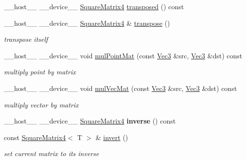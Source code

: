 \begin{DoxyCompactItemize}
\item 
\+\_\+\+\_\+host\+\_\+\+\_\+ \+\_\+\+\_\+device\+\_\+\+\_\+ \hyperlink{class_square_matrix4}{Square\+Matrix4} \hyperlink{class_square_matrix4_a23f36c4b337c5b238b4d3fae04e6f2f0}{transposed} () const
\item 
\+\_\+\+\_\+host\+\_\+\+\_\+ \+\_\+\+\_\+device\+\_\+\+\_\+ \hyperlink{class_square_matrix4}{Square\+Matrix4} \& \hyperlink{class_square_matrix4_a7d6f675b8ae538a7c53fe1e8c390e8b3}{transpose} ()\hypertarget{class_square_matrix4_a7d6f675b8ae538a7c53fe1e8c390e8b3}{}\label{class_square_matrix4_a7d6f675b8ae538a7c53fe1e8c390e8b3}

\begin{DoxyCompactList}\small\item\em transpose itself \end{DoxyCompactList}\item 
\+\_\+\+\_\+host\+\_\+\+\_\+ \+\_\+\+\_\+device\+\_\+\+\_\+ void \hyperlink{class_square_matrix4_a96f083743422ca964d865b1034e608b4}{mul\+Point\+Mat} (const \hyperlink{class_vec3}{Vec3} \&src, \hyperlink{class_vec3}{Vec3} \&dst) const
\begin{DoxyCompactList}\small\item\em multiply point by matrix \end{DoxyCompactList}\item 
\+\_\+\+\_\+host\+\_\+\+\_\+ \+\_\+\+\_\+device\+\_\+\+\_\+ void \hyperlink{class_square_matrix4_a559765a38296c2949976c00347098fb0}{mul\+Vec\+Mat} (const \hyperlink{class_vec3}{Vec3} \&src, \hyperlink{class_vec3}{Vec3} \&dst) const
\begin{DoxyCompactList}\small\item\em multiply vector by matrix \end{DoxyCompactList}\item 
\+\_\+\+\_\+host\+\_\+\+\_\+ \+\_\+\+\_\+device\+\_\+\+\_\+ \hyperlink{class_square_matrix4}{Square\+Matrix4} {\bfseries inverse} () const\hypertarget{class_square_matrix4_a5af6eeea8a8080858fc607a7e6a25c79}{}\label{class_square_matrix4_a5af6eeea8a8080858fc607a7e6a25c79}

\item 
const \hyperlink{class_square_matrix4}{Square\+Matrix4}$<$ T $>$ \& \hyperlink{class_square_matrix4_acbf913e66c1c7b846bc25d7b2c0df31d}{invert} ()\hypertarget{class_square_matrix4_acbf913e66c1c7b846bc25d7b2c0df31d}{}\label{class_square_matrix4_acbf913e66c1c7b846bc25d7b2c0df31d}

\begin{DoxyCompactList}\small\item\em set current matrix to its inverse \end{DoxyCompactList}\end{DoxyCompactItemize}
